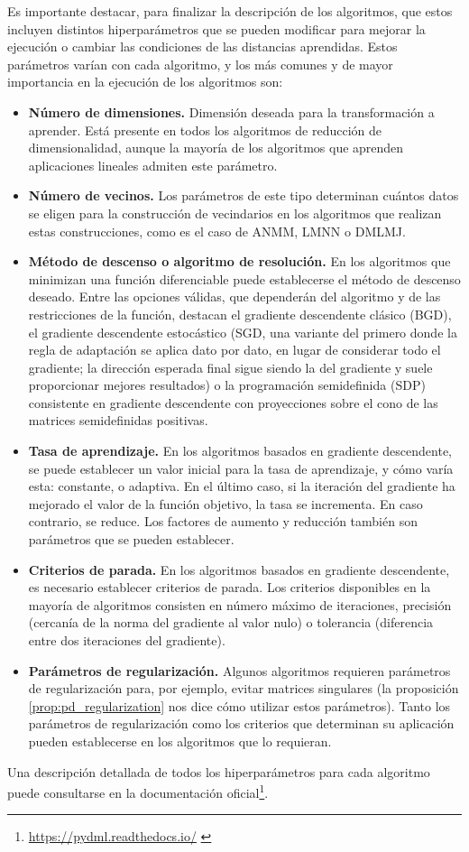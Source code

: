 Es importante destacar, para finalizar la descripción de los algoritmos, que estos incluyen distintos hiperparámetros que se pueden modificar para mejorar la ejecución o cambiar las condiciones de las distancias aprendidas. Estos parámetros varían con cada algoritmo, y los más comunes y de mayor importancia en la ejecución de los algoritmos son:
\begin{itemize}
    \item \textbf{Número de dimensiones.} Dimensión deseada para la transformación a aprender. Está presente en todos los algoritmos de reducción de dimensionalidad, aunque la mayoría de los algoritmos que aprenden aplicaciones lineales admiten este parámetro.
    \item \textbf{Número de vecinos.} Los parámetros de este tipo determinan cuántos datos se eligen para la construcción de vecindarios en los algoritmos que realizan estas construcciones, como es el caso de ANMM, LMNN o DMLMJ.
    \item \textbf{Método de descenso o algoritmo de resolución.} En los algoritmos que minimizan una función diferenciable puede establecerse el método de descenso deseado. Entre las opciones válidas, que dependerán del algoritmo y de las restricciones de la función, destacan el gradiente descendente clásico (BGD), el gradiente descendente estocástico (SGD, una variante del primero donde la regla de adaptación se aplica dato por dato, en lugar de considerar todo el gradiente; la dirección esperada final sigue siendo la del gradiente y suele proporcionar mejores resultados) o la programación semidefinida (SDP) consistente en gradiente descendente con proyecciones sobre el cono de las matrices semidefinidas positivas.
    \item \textbf{Tasa de aprendizaje.} En los algoritmos basados en gradiente descendente, se puede establecer un valor inicial para la tasa de aprendizaje, y cómo varía esta: constante, o adaptiva. En el último caso, si la iteración del gradiente ha mejorado el valor de la función objetivo, la tasa se incrementa. En caso contrario, se reduce. Los factores de aumento y reducción también son parámetros que se pueden establecer.
    \item \textbf{Criterios de parada.} En los algoritmos basados en gradiente descendente, es necesario establecer criterios de parada. Los criterios disponibles en la mayoría de algoritmos consisten en número máximo de iteraciones, precisión (cercanía de la norma del gradiente al valor nulo) o tolerancia (diferencia entre dos iteraciones del gradiente).
    \item \textbf{Parámetros de regularización.} Algunos algoritmos requieren parámetros de regularización para, por ejemplo, evitar matrices singulares (la proposición \ref{prop:pd_regularization} nos dice cómo utilizar estos parámetros). Tanto los parámetros de regularización como los criterios que determinan su aplicación pueden establecerse en los algoritmos que lo requieran.
\end{itemize}
Una descripción detallada de todos los hiperparámetros para cada algoritmo puede consultarse en la documentación oficial\footnote{\url{https://pydml.readthedocs.io/} \label{pydml_doc_url}}.

